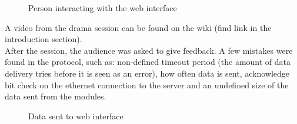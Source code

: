 \begin{figure}[H]
  \centering
  \hspace{0.2cm}                
  \caption{Person interacting with the web interface}
  \label{fig:drama_web}
\end{figure}

A video from the drama session can be found on the wiki (find link in the introduction section).
\\[0.2cm]
After the session, the audience was asked to give feedback. A few mistakes were found in the protocol, such as: non-defined timeout period (the amount of data delivery tries before it is seen as an error), how often data is sent, acknowledge bit check on the ethernet connection to the server and an undefined size of the data sent from the modules. 

\begin{figure}[H]
  \centering
  \hspace{0.2cm}                
  \caption{Data sent to web interface}
  \label{fig:drama_data_to_web}
\end{figure}

